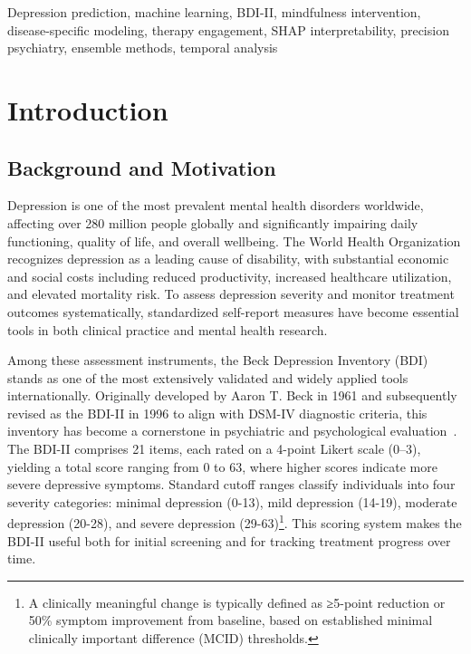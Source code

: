 \documentclass[conference]{IEEEtran}
\begin{document}
\begin{IEEEkeywords}
Depression prediction, machine learning, BDI-II, mindfulness intervention, disease-specific modeling, therapy engagement, SHAP interpretability, precision psychiatry, ensemble methods, temporal analysis
\end{IEEEkeywords}

\section{Introduction}

\subsection{Background and Motivation}

Depression is one of the most prevalent mental health disorders worldwide, affecting over 280 million people globally and significantly impairing daily functioning, quality of life, and overall wellbeing. The World Health Organization recognizes depression as a leading cause of disability, with substantial economic and social costs including reduced productivity, increased healthcare utilization, and elevated mortality risk. To assess depression severity and monitor treatment outcomes systematically, standardized self-report measures have become essential tools in both clinical practice and mental health research.

Among these assessment instruments, the Beck Depression Inventory (BDI) stands as one of the most extensively validated and widely applied tools internationally. Originally developed by Aaron T. Beck in 1961 and subsequently revised as the BDI-II in 1996 to align with DSM-IV diagnostic criteria, this inventory has become a cornerstone in psychiatric and psychological evaluation~\cite{beck1996manual}. The BDI-II comprises 21 items, each rated on a 4-point Likert scale (0–3), yielding a total score ranging from 0 to 63, where higher scores indicate more severe depressive symptoms. Standard cutoff ranges classify individuals into four severity categories: minimal depression (0-13), mild depression (14-19), moderate depression (20-28), and severe depression (29-63)\footnote{A clinically meaningful change is typically defined as ≥5-point reduction or 50\% symptom improvement from baseline, based on established minimal clinically important difference (MCID) thresholds.}. This scoring system makes the BDI-II useful both for initial screening and for tracking treatment progress over time.
\end{document}

